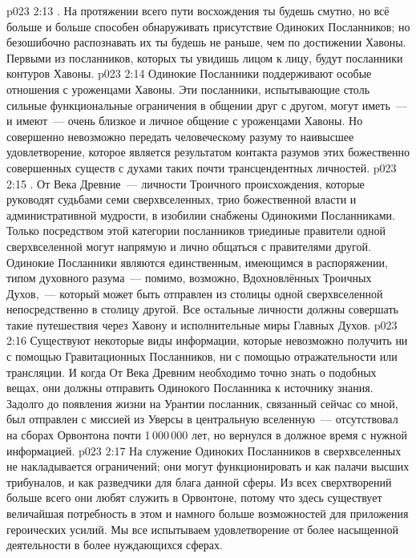 \vs p023 2:13 . На протяжении всего пути восхождения ты будешь смутно, но всё больше и больше способен обнаруживать присутствие Одиноких Посланников; но безошибочно распознавать их ты будешь не раньше, чем по достижении Хавоны. Первыми из посланников, которых ты увидишь лицом к лицу, будут посланники контуров Хавоны.
\vs p023 2:14 Одинокие Посланники поддерживают особые отношения с уроженцами Хавоны. Эти посланники, испытывающие столь сильные функциональные ограничения в общении друг с другом, могут иметь~--- и имеют~--- очень близкое и личное общение с уроженцами Хавоны. Но совершенно невозможно передать человеческому разуму то наивысшее удовлетворение, которое является результатом контакта разумов этих божественно совершенных существ с духами таких почти трансцендентных личностей.
\vs p023 2:15 . От Века Древние~--- личности Троичного происхождения, которые руководят судьбами семи сверхвселенных, трио божественной власти и административной мудрости, в изобилии снабжены Одинокими Посланниками. Только посредством этой категории посланников триединые правители одной сверхвселенной могут напрямую и лично общаться с правителями другой. Одинокие Посланники являются единственным, имеющимся в распоряжении, типом духовного разума~--- помимо, возможно, Вдохновлённых Троичных Духов,~--- который может быть отправлен из столицы одной сверхвселенной непосредственно в столицу другой. Все остальные личности должны совершать такие путешествия через Хавону и исполнительные миры Главных Духов.
\vs p023 2:16 Существуют некоторые виды информации, которые невозможно получить ни с помощью Гравитационных Посланников, ни с помощью отражательности или трансляции. И когда От Века Древним необходимо точно знать о подобных вещах, они должны отправить Одинокого Посланника к источнику знания. Задолго до появления жизни на Урантии посланник, связанный сейчас со мной, был отправлен с миссией из Уверсы в центральную вселенную~--- отсутствовал на сборах Орвонтона почти 1\,000\,000 лет, но вернулся в должное время с нужной информацией.
\vs p023 2:17 На служение Одиноких Посланников в сверхвселенных не накладывается ограничений; они могут функционировать и как палачи высших трибуналов, и как разведчики для блага данной сферы. Из всех сверхтворений больше всего они любят служить в Орвонтоне, потому что здесь существует величайшая потребность в этом и намного больше возможностей для приложения героических усилий. Мы все испытываем удовлетворение от более насыщенной деятельности в более нуждающихся сферах.
